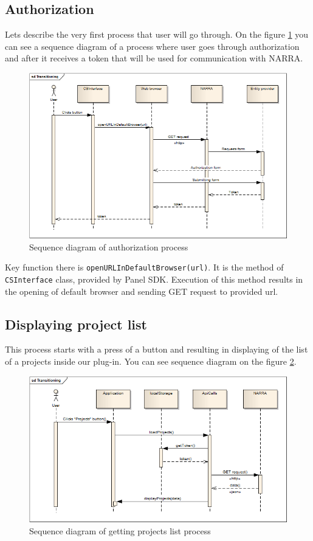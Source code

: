 \documentclass[thesis=B,english]{FITthesis}[2012/10/20]
\begin{document}
\subsection{Authorization}
Lets describe the very first process that user will go through. On the figure \ref{fig:seq_auth} you can see a sequence diagram of a process where user goes through authorization and after it receives a token that will be used for communication with NARRA.
	\begin{figure}
		\centering
		\includegraphics[width=1\textwidth]{AuthSeqDiag.png}
		\caption{Sequence diagram of authorization process}\label{fig:seq_auth}
	\end{figure}

Key function there is \texttt{openURLInDefaultBrowser(url)}. It is the method of \texttt{CSInterface} class, provided by Panel SDK. Execution of this method results in the opening of default browser and sending GET request to provided url.
\subsection{Displaying project list}
This process starts with a press of a button and resulting in displaying of the list of a projects inside our plug-in. You can see sequence diagram on the figure \ref{fig:seq_project}.
	\begin{figure}
		\centering
		\includegraphics[width=1\textwidth]{ProjectsSeqDiag.png}
		\caption{Sequence diagram of getting projects list process}\label{fig:seq_project}
	\end{figure}
\end{document}
